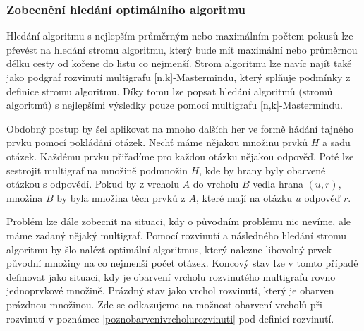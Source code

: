 \subsubsection{Zobecnění hledání optimálního algoritmu}
Hledání algoritmu s nejlepším průměrným nebo maximálním počtem pokusů lze převést na hledání stromu algoritmu, který bude mít maximální nebo průměrnou délku cesty od kořene do listu co nejmenší. Strom algoritmu lze navíc najít také jako podgraf rozvinutí multigrafu [n,k]-Mastermindu, který splňuje podmínky z definice stromu algoritmu. Díky tomu lze popsat hledání algoritmů (stromů algoritmů) s nejlepšími výsledky pouze pomocí multigrafu [n,k]-Mastermindu. 

Obdobný postup by šel aplikovat na mnoho dalších her ve formě hádání tajného prvku pomocí pokládání otázek. Nechť máme nějakou množinu prvků $H$ a sadu otázek. Každému prvku přiřadíme pro každou otázku nějakou odpověď. Poté lze sestrojit multigraf na množině podmnožin $H$, kde by hrany byly obarvené otázkou s odpovědí. Pokud by z vrcholu $A$ do vrcholu $B$ vedla hrana $(u,r)$, množina $B$ by byla množina těch prvků z $A$, které mají na otázku $u$ odpověď $r$. 

Problém lze dále zobecnit na situaci, kdy o původním problému nic nevíme, ale máme zadaný nějaký multigraf. Pomocí rozvinutí a následného hledání stromu algoritmu by šlo nalézt optimální algoritmus, který nalezne libovolný prvek původní množiny na co nejmenší počet otázek. Koncový stav lze v tomto případě definovat jako situaci, kdy je obarvení vrcholu rozvinutého multigrafu rovno jednoprvkové množině. Prázdný stav jako vrchol rozvinutí, který je obarven prázdnou množinou. Zde se odkazujeme na možnost obarvení vrcholů při rozvinutí v poznámce \ref{poznobarvenivrcholurozvinuti} pod definicí rozvinutí.




